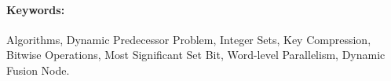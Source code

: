 \paragraph*{Keywords:} Algorithms, Dynamic Predecessor Problem, Integer Sets, Key Compression, Bitwise Operations, Most Significant Set Bit, Word-level Parallelism, Dynamic Fusion Node.

    
    
    


